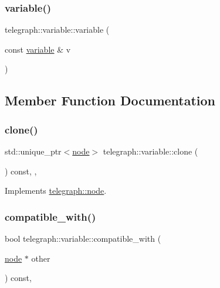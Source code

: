 \subsubsection{\texorpdfstring{variable()}{variable()}\hspace{0.1cm}{\footnotesize\ttfamily [2/2]}}
{\footnotesize\ttfamily telegraph\+::variable\+::variable (\begin{DoxyParamCaption}\item[{const \hyperlink{classtelegraph_1_1variable}{variable} \&}]{v }\end{DoxyParamCaption})\hspace{0.3cm}{\ttfamily [inline]}}



\subsection{Member Function Documentation}
\mbox{\label{classtelegraph_1_1variable_a25d2ba4ae52c2bcad99a34b84ce7407b}} 
\subsubsection{\texorpdfstring{clone()}{clone()}}
{\footnotesize\ttfamily std\+::unique\+\_\+ptr$<$\hyperlink{classtelegraph_1_1node}{node}$>$ telegraph\+::variable\+::clone (\begin{DoxyParamCaption}{ }\end{DoxyParamCaption}) const\hspace{0.3cm}{\ttfamily [inline]}, {\ttfamily [override]}, {\ttfamily [virtual]}}



Implements \hyperlink{classtelegraph_1_1node_ae90515f4573cfa43c168cba9d542df6b}{telegraph\+::node}.

\mbox{\label{classtelegraph_1_1variable_a4075427712d7286318b8ee7bb8c207b8}} 
\subsubsection{\texorpdfstring{compatible\+\_\+with()}{compatible\_with()}}
{\footnotesize\ttfamily bool telegraph\+::variable\+::compatible\+\_\+with (\begin{DoxyParamCaption}\item[{\hyperlink{classtelegraph_1_1node}{node} $\ast$}]{other }\end{DoxyParamCaption}) const\hspace{0.3cm}{\ttfamily [override]}, {\ttfamily [virtual]}}



